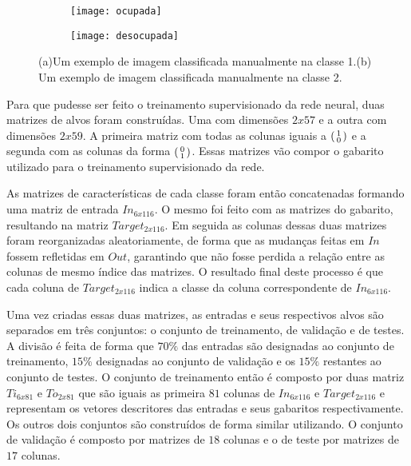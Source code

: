 \begin{figure}
\centering
\begin{subfigure}{.1\textwidth}
  \centering
  \texttt{[image: ocupada]}
  \caption{}
  \label{fig:exemploRede:sub:ocupada}
\end{subfigure}%
\begin{subfigure}{.1\textwidth}
  \centering
  \texttt{[image: desocupada]}
  \caption{}
  \label{fig:exemploRede:sub:desocupada}
\end{subfigure}
\centering
\caption{(a)Um exemplo de imagem classificada manualmente na classe 1.(b) Um exemplo de imagem classificada manualmente na classe 2.}
\label{fig:exemploRede}
\end{figure}

Para que pudesse ser feito o treinamento supervisionado da rede neural, duas matrizes de alvos foram construídas. Uma com dimensões $2x57$ e a outra com dimensões $2x59$. A primeira matriz com todas as colunas iguais a $\begin{psmallmatrix}1\\0\end{psmallmatrix}$ e a segunda com as colunas da forma $\begin{psmallmatrix}0\\1\end{psmallmatrix}$. Essas matrizes vão compor o gabarito utilizado para o treinamento supervisionado da rede.

As matrizes  de características de cada classe foram então concatenadas formando uma matriz de entrada $In_{6x116}$. O mesmo foi feito com as matrizes do gabarito, resultando na matriz $Target_{2x116}$. Em seguida as colunas dessas duas matrizes foram reorganizadas aleatoriamente, de forma que as mudanças feitas em $In$ fossem refletidas em $Out$, garantindo que não fosse perdida a relação entre as colunas de mesmo índice das matrizes. O resultado final deste processo é que cada coluna de $Target_{2x116}$ indica a classe da coluna correspondente de $In_{6x116}$.

Uma vez criadas essas duas matrizes, as entradas e seus respectivos alvos são separados em três conjuntos: o conjunto de treinamento, de validação e de testes. A divisão é feita de forma que $70\%$ das entradas são designadas ao conjunto de treinamento, $15\%$ designadas ao conjunto de validação e os $15\%$ restantes ao conjunto de testes. O conjunto de treinamento então é composto por duas matriz $Ti_{6x81}$ e $To_{2x81}$ que são iguais as primeira $81$ colunas de $In_{6x116}$ e $Target_{2x116}$ e representam os vetores descritores das entradas e seus gabaritos respectivamente. Os outros dois conjuntos são construídos de forma similar utilizando. O conjunto de validação é composto por matrizes de $18$ colunas e o de teste por matrizes de $17$ colunas.


